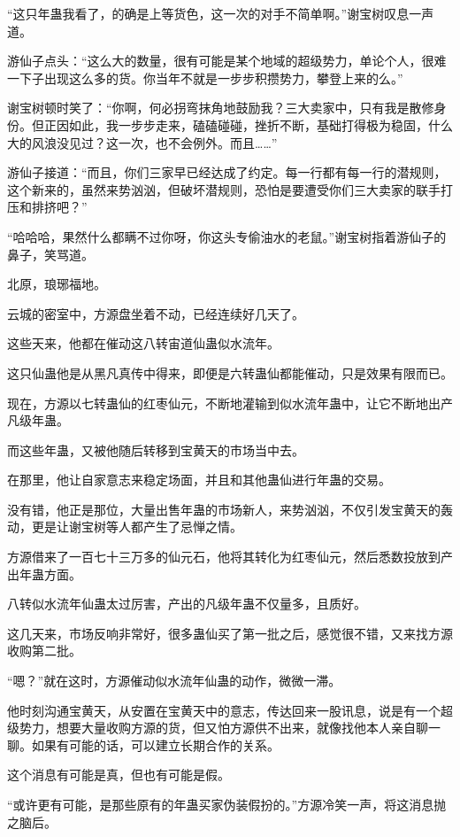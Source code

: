 \begin{this_body}
“这只年蛊我看了，的确是上等货色，这一次的对手不简单啊。”谢宝树叹息一声道。

游仙子点头：“这么大的数量，很有可能是某个地域的超级势力，单论个人，很难一下子出现这么多的货。你当年不就是一步步积攒势力，攀登上来的么。”

谢宝树顿时笑了：“你啊，何必拐弯抹角地鼓励我？三大卖家中，只有我是散修身份。但正因如此，我一步步走来，磕磕碰碰，挫折不断，基础打得极为稳固，什么大的风浪没见过？这一次，也不会例外。而且……”

游仙子接道：“而且，你们三家早已经达成了约定。每一行都有每一行的潜规则，这个新来的，虽然来势汹汹，但破坏潜规则，恐怕是要遭受你们三大卖家的联手打压和排挤吧？”

“哈哈哈，果然什么都瞒不过你呀，你这头专偷油水的老鼠。”谢宝树指着游仙子的鼻子，笑骂道。

北原，琅琊福地。

云城的密室中，方源盘坐着不动，已经连续好几天了。

这些天来，他都在催动这八转宙道仙蛊似水流年。

这只仙蛊他是从黑凡真传中得来，即便是六转蛊仙都能催动，只是效果有限而已。

现在，方源以七转蛊仙的红枣仙元，不断地灌输到似水流年蛊中，让它不断地出产凡级年蛊。

而这些年蛊，又被他随后转移到宝黄天的市场当中去。

在那里，他让自家意志来稳定场面，并且和其他蛊仙进行年蛊的交易。

没有错，他正是那位，大量出售年蛊的市场新人，来势汹汹，不仅引发宝黄天的轰动，更是让谢宝树等人都产生了忌惮之情。

方源借来了一百七十三万多的仙元石，他将其转化为红枣仙元，然后悉数投放到产出年蛊方面。

八转似水流年仙蛊太过厉害，产出的凡级年蛊不仅量多，且质好。

这几天来，市场反响非常好，很多蛊仙买了第一批之后，感觉很不错，又来找方源收购第二批。

“嗯？”就在这时，方源催动似水流年仙蛊的动作，微微一滞。

他时刻沟通宝黄天，从安置在宝黄天中的意志，传达回来一股讯息，说是有一个超级势力，想要大量收购方源的货，但又怕方源供不出来，就像找他本人亲自聊一聊。如果有可能的话，可以建立长期合作的关系。

这个消息有可能是真，但也有可能是假。

“或许更有可能，是那些原有的年蛊买家伪装假扮的。”方源冷笑一声，将这消息抛之脑后。


\end{this_body}
